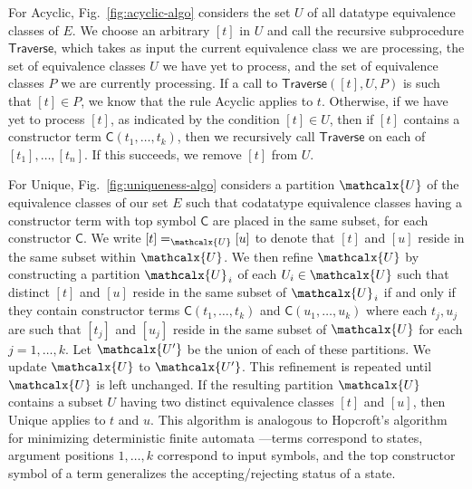 \documentclass[smallcondensed,draft]{svjour3}
\newcommand\const[1]{\textsf{#1}}
\newcommand{\Ec}{E}
\newcommand{\rn}[1]{\textsf{#1}}
\newcommand{\ec}[1]{[#1]}
\newcommand\vthinspace{\kern+0.083333em}
\begin{document}
For \rn{Acyclic}, Fig.~\ref{fig:acyclic-algo} considers the set $U$ of all datatype equivalence classes of $\Ec$.
We choose an arbitrary $\ec{t}$ in $U$ and call the recursive subprocedure $\rn{Traverse}$,
which takes as input the current equivalence class we are processing, the set of equivalence classes $U$ we have yet to process,
and the set of equivalence classes $P$ we are currently processing.
If a call to $\rn{Traverse}( \ec{t}, U, P )$ is such that $\ec{t} \in P$,
we know that the rule \rn{Acyclic} applies to $t$.
Otherwise, if we have yet to process $\ec{t}$, as indicated by the condition $\ec{t} \in U$,
then if $\ec{t}$ contains a constructor term $\const{C}( t_1, \ldots, t_k )$, 
then we recursively call $\rn{Traverse}$ on each of $\ec{t_1}, \ldots, \ec{t_n}$.
If this succeeds, we remove $\ec{t}$ from $U$.

For \rn{Unique}, Fig.~\ref{fig:uniqueness-algo} considers a partition $\mathcalx{U}$ of the equivalence classes of our set $\Ec$
such that codatatype equivalence classes having a constructor term with top symbol $\const{C}$ are placed in the same subset, 
for each constructor $\const{C}$.
We write $\ec{t} =_{\mathcalx{U}} \ec{u}$ to denote that $\ec{t}$ and $\ec{u}$ reside in the same subset within $\mathcalx{U}$.
We then refine $\mathcalx{U}$ by 
constructing a partition $\mathcalx{U}_{\vthinspace i}$ of each $U_i \in \mathcalx{U}$ such that distinct $\ec{t}$ and $\ec{u}$ reside in the same subset of $\mathcalx{U}_{\vthinspace i}$ 
if and only if they contain constructor terms $\const{C}( t_1, \ldots, t_k )$ and $\const{C}( u_1, \ldots, u_k )$
where each $t_j, u_j$ are such that $\ec{t_j}$ and $\ec{u_j}$ reside in the same subset of $\mathcalx{U}$ for each $j=1, \ldots, k$.
Let $\mathcalx{U'}$ be the union of each of these partitions.
We update $\mathcalx{U}$ to $\mathcalx{U'}$.
This refinement is repeated until $\mathcalx{U}$ is left unchanged.
If the resulting partition $\mathcalx{U}$ contains a subset $U$ having two distinct equivalence classes $\ec{t}$ and $\ec{u}$, then \rn{Unique} applies to $t$ and $u$.
This algorithm is analogous to Hopcroft's algorithm for minimizing
deterministic finite automata \cite{hopcroft-1971}---terms correspond to
states, argument positions $1,\ldots,k$ correspond to input symbols, and the top constructor symbol
of a term generalizes the accepting/rejecting status of a state.
\end{document}
